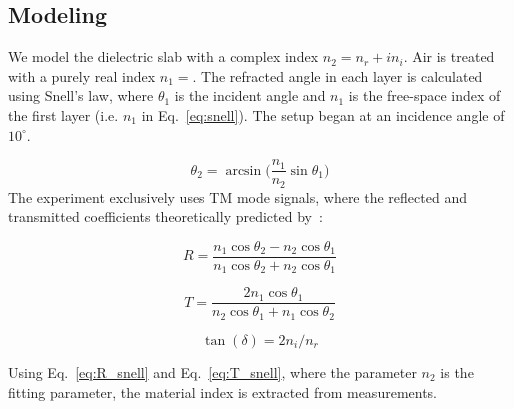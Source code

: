 \subsection{Modeling}
\label{subsec:mcmc}
We model the dielectric slab with a complex index $n_2 = n_r + in_i$.  Air is treated with a purely real index $n_1 = $. The refracted angle in each layer is calculated using Snell's law, where $\theta_1$ is the incident angle and $n_1$ is the free-space
index of the first layer (i.e. $n_1$ in Eq.~\ref{eq:snell}). The setup began at an incidence angle of $10^{\circ}$.

\begin{equation}
    \theta_2 = \arcsin\bigg(\frac{n_1}{n_2}\sin\theta_1\bigg)
    \label{eq:snell}
\end{equation}
The experiment exclusively uses TM mode signals, where the reflected and transmitted coefficients theoretically
predicted by~\cite{jackson}:

\begin{equation}
    R = \frac{n_1 \cos\theta_2 - n_2\cos\theta_1}{n_1\cos\theta_2 + n_2\cos\theta_1}
    \label{eq:R_snell}
\end{equation}

\begin{equation}
    T = \frac{2 n_1 \cos\theta_1}{n_2\cos\theta_1 + n_1\cos\theta_2}
    \label{eq:T_snell}
\end{equation}

\begin{equation}
    \tan(\delta) = 2n_i/n_r
    \label{eq:loss}
\end{equation}

Using Eq.~\ref{eq:R_snell} and Eq.~\ref{eq:T_snell}, where the parameter $n_2$ is the fitting parameter, the material index is extracted from measurements. 

